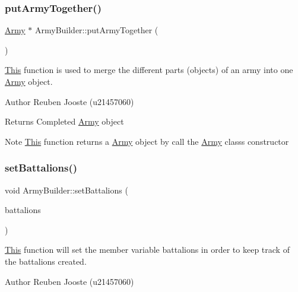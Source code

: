 \subsubsection{\texorpdfstring{putArmyTogether()}{putArmyTogether()}}
{\footnotesize\ttfamily \mbox{\hyperlink{class_army}{Army}} $\ast$ Army\+Builder\+::put\+Army\+Together (\begin{DoxyParamCaption}{ }\end{DoxyParamCaption})}



\mbox{\hyperlink{class_this}{This}} function is used to merge the different parts (objects) of an army into one \mbox{\hyperlink{class_army}{Army}} object. 

\begin{DoxyAuthor}{Author}
Reuben Jooste (u21457060) 
\end{DoxyAuthor}
\begin{DoxyReturn}{Returns}
Completed \mbox{\hyperlink{class_army}{Army}} object 
\end{DoxyReturn}
\begin{DoxyNote}{Note}
\mbox{\hyperlink{class_this}{This}} function returns a \mbox{\hyperlink{class_army}{Army}} object by call the \mbox{\hyperlink{class_army}{Army}} class\textquotesingle{}s constructor 
\end{DoxyNote}
\mbox{\label{class_army_builder_a42dc02e38cf9c9f1ec18026e20cabb69}} 
\subsubsection{\texorpdfstring{setBattalions()}{setBattalions()}}
{\footnotesize\ttfamily void Army\+Builder\+::set\+Battalions (\begin{DoxyParamCaption}\item[{std\+::vector$<$ \mbox{\hyperlink{class_army_component}{Army\+Component}} $\ast$ $>$ $\ast$}]{battalions }\end{DoxyParamCaption})}



\mbox{\hyperlink{class_this}{This}} function will set the member variable battalions in order to keep track of the battalions created. 

\begin{DoxyAuthor}{Author}
Reuben Jooste (u21457060) 
\end{DoxyAuthor}


